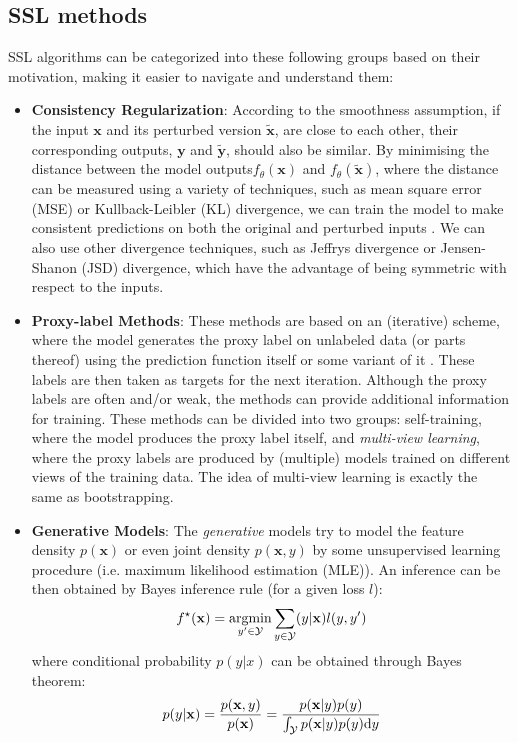 \subsection{SSL methods}
SSL algorithms can be categorized into these following groups based on their motivation, making it easier to navigate and understand them\cite{ssl-overview-2020}:
\begin{itemize}
        \item \textbf{Consistency Regularization}: According to the smoothness assumption, if the input $\mathbf{x}$ and its perturbed version $\tilde{\mathbf{x}}$, 
        are close to each other, their corresponding outputs, $\mathbf{y}$ and $\tilde{\mathbf{y}}$, should also be similar. By minimising the 
        distance between the model outputs$f_\theta(\mathbf{x})$ and $f_\theta(\tilde{\mathbf{x}})$, where the distance can be measured using 
        a variety of techniques, such as mean square error (MSE) or Kullback-Leibler (KL) divergence, we can train the model to make consistent
        predictions on both the original and perturbed inputs \cite{temporal-ensembling-2017,regularization-&-pertrubations-2016}.
        We can also use other divergence techniques, such as Jeffrys divergence or Jensen-Shanon (JSD) divergence, which have the advantage of 
        being symmetric with respect to the inputs.
    \item \textbf{Proxy-label Methods}: These methods are based on an (iterative) scheme, where the model generates the proxy label on unlabeled data (or parts 
        thereof) using the prediction function itself or some variant of it \cite{psuedo-label-2013}. These labels are then taken as targets for the next iteration.
        Although the proxy labels are often and/or weak, the methods can provide additional information for training. These methods can be divided into two groups: 
        self-training, where the model produces the proxy label itself, and \textit{multi-view learning}, where the proxy labels are produced by (multiple) models
        trained on different views of the training data. The idea of multi-view learning is exactly the same as bootstrapping.


    \item \textbf{Generative Models}:\label{generative-modelling} The \textit{generative} models try to model the feature density $p(\mathbf{x})$ or even joint density 
        $p(\mathbf{x},y)$ by some unsupervised learning procedure (i.e. maximum likelihood estimation (MLE)). An inference can be then obtained by Bayes 
        inference rule (for a given loss $l$):
        \begin{equation*}
            f^{\star}(\mathbf{x}) = \mathop{\rm argmin}_{y^\prime\in \mathcal{Y}} \sum_{y \in \mathcal{Y}}(y|\mathbf{x})l(y,y^\prime)
        \end{equation*}
        where conditional probability $p(y|x)$ can be obtained through Bayes theorem:
        \begin{equation*}
            p(y|\mathbf{x}) = \frac{p(\mathbf{x},y)}{p(\mathbf{x})} =\frac{p(\mathbf{x}|y)p(y)}{\int_\mathcal{Y} p(\mathbf{x}|y)p(y) \mbox{\rm d}y}
        \end{equation*}


\end{itemize}
